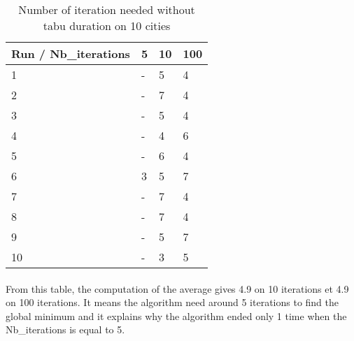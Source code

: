 \documentclass[12pt,oneside,a4paper]{article}
\begin{document}
\begin{table}[h]
    \centering
    \small
    \begin{tabular}{llll}
      \hline
      \multicolumn{1}{|l|}{\textbf{Run / Nb\_iterations}}& \multicolumn{1}{l|}{\textbf{5}} & \multicolumn{1}{l|}{\textbf{10}} & \multicolumn{1}{l|}{\textbf{100}}\\ \hline
      \multicolumn{1}{|l|}{1} & \multicolumn{1}{l|}{-}  & \multicolumn{1}{l|}{5}  & \multicolumn{1}{l|}{4}  \\ \hline
      \multicolumn{1}{|l|}{2} & \multicolumn{1}{l|}{-}  & \multicolumn{1}{l|}{7}  & \multicolumn{1}{l|}{4}  \\ \hline         
      \multicolumn{1}{|l|}{3} & \multicolumn{1}{l|}{-}  & \multicolumn{1}{l|}{5}  & \multicolumn{1}{l|}{4}  \\ \hline
      \multicolumn{1}{|l|}{4} & \multicolumn{1}{l|}{-}  & \multicolumn{1}{l|}{4}  & \multicolumn{1}{l|}{6}  \\ \hline
      \multicolumn{1}{|l|}{5} & \multicolumn{1}{l|}{-}  & \multicolumn{1}{l|}{6}  & \multicolumn{1}{l|}{4}  \\ \hline
      \multicolumn{1}{|l|}{6} & \multicolumn{1}{l|}{3}  & \multicolumn{1}{l|}{5}  & \multicolumn{1}{l|}{7}  \\ \hline
      \multicolumn{1}{|l|}{7} & \multicolumn{1}{l|}{-}  & \multicolumn{1}{l|}{7}  & \multicolumn{1}{l|}{4}  \\ \hline
      \multicolumn{1}{|l|}{8} & \multicolumn{1}{l|}{-}  & \multicolumn{1}{l|}{7}  & \multicolumn{1}{l|}{4}  \\ \hline
      \multicolumn{1}{|l|}{9} & \multicolumn{1}{l|}{-}  & \multicolumn{1}{l|}{5}  & \multicolumn{1}{l|}{7}  \\ \hline
      \multicolumn{1}{|l|}{10} & \multicolumn{1}{l|}{-}  & \multicolumn{1}{l|}{3}  & \multicolumn{1}{l|}{5}  \\ \hline
    \end{tabular}
    \caption{Number of iteration needed without tabu duration on 10 cities}
    \label{Performances scénario 0}
  \end{table}

\paragraph{}
    From this table, the computation of the average gives 4.9 on 10 iterations et 4.9 on 100 iterations.
    It means the algorithm need around 5 iterations to find the global minimum and it explains why the algorithm
    ended only 1 time when the Nb\_iterations is equal to 5.
\end{document}
